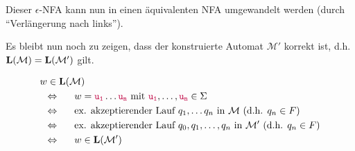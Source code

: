\documentclass{beamer}
\newcommand{\Sterm}[1]{\ensuremath{\mathtt{\textcolor{purple}{#1}}}}    %
\newcommand{\Slang}[1]{\textbf{\textcolor{black}{#1}}}    %
\begin{document}
	\begin{frame}
		\small
		Dieser $\epsilon$-NFA kann nun in einen äquivalenten NFA umgewandelt werden (durch \enquote{Verlängerung nach links}).
		
		Es bleibt nun noch zu zeigen, dass der konstruierte Automat $\mathcal{M}'$ korrekt ist, d.h. $\Slang{L}(\mathcal{M}) = \Slang{L}(\mathcal{M}')$ gilt.
		
		\begin{align*}
			&w \in \Slang{L}(\mathcal{M}) \\
			&\equivalent \quad w = \Sterm{u_1} \dots \Sterm{u_n} \text{ mit } \Sterm{u_1}, \dots, \Sterm{u_n} \in \Sigma \\
			&\equivalent \quad \text{ex. akzeptierender Lauf } q_1, \dots q_n \text{ in } \mathcal{M} \text{ (d.h. $q_n \in F$)}\\
			&\equivalent \quad \text{ex. akzeptierender Lauf } q_0, q_1, \dots, q_n \text{ in } \mathcal{M}' \text{ (d.h. $q_n \in F$)} \\
			&\equivalent \quad w \in \Slang{L}(\mathcal{M}')
		\end{align*}
	\end{frame}
\end{document}
